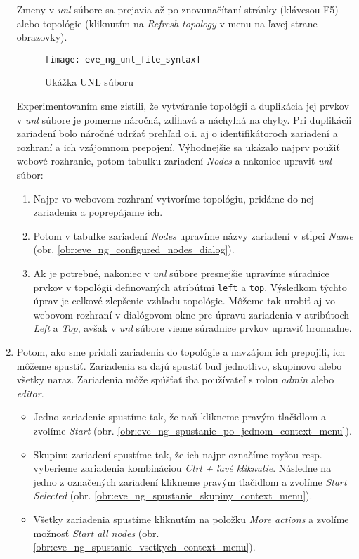\begin{enumerate}[noitemsep]
Zmeny v \emph{unl} súbore sa prejavia až po znovunačítaní stránky (klávesou F5) alebo topológie (kliknutím na \emph{Refresh topology} v menu na ľavej strane obrazovky).

\begin{figure}
    \centering
    \texttt{[image: eve\_ng\_unl\_file\_syntax]}
    \caption{Ukážka UNL súboru}
    \label{obr:eve_ng_unl_file_syntax}
\end{figure}
    
Experimentovaním sme zistili, že vytváranie topológii a duplikácia jej prvkov v \emph{unl} súbore je pomerne náročná, zdĺhavá a náchylná na chyby. Pri duplikácii zariadení bolo náročné udržať prehľad o.i. aj o identifikátoroch zariadení a rozhraní a ich vzájomnom prepojení. Výhodnejšie sa ukázalo najprv použiť webové rozhranie, potom tabuľku zariadení \emph{Nodes} a nakoniec upraviť \emph{unl} súbor:
    
    \begin{enumerate}[noitemsep]
        \item Najpr vo webovom rozhraní vytvoríme topológiu, pridáme do nej zariadenia a poprepájame ich.
        \item Potom v tabuľke zariadení \emph{Nodes} upravíme názvy zariadení v stĺpci \emph{Name} (obr. \ref{obr:eve_ng_configured_nodes_dialog}).
        \item Ak je potrebné, nakoniec v \emph{unl} súbore presnejšie upravíme súradnice prvkov v topológii definovaných atribútmi \texttt{left} a \texttt{top}. Výsledkom týchto úprav je celkové zlepšenie vzhľadu topológie. Môžeme tak urobiť aj vo webovom rozhraní v dialógovom okne pre úpravu zariadenia v atribútoch \emph{Left} a \emph{Top}, avšak v \emph{unl} súbore vieme súradnice prvkov upraviť hromadne.
    \end{enumerate}
    
    \item Potom, ako sme pridali zariadenia do topológie a navzájom ich prepojili, ich môžeme spustiť. Zariadenia sa dajú spustiť buď jednotlivo, skupinovo alebo všetky naraz. Zariadenia môže spúšťať iba používateľ s rolou \emph{admin} alebo \emph{editor}.

    \begin{itemize}[noitemsep]
        \item Jedno zariadenie spustíme tak, že naň klikneme pravým tlačidlom a zvolíme \emph{Start} (obr. \ref{obr:eve_ng_spustanie_po_jednom_context_menu}).
        \item Skupinu zariadení spustíme tak, že ich najpr označíme myšou resp. vyberieme zariadenia kombináciou \emph{Ctrl + ľavé kliknutie}. Následne na jedno z označených zariadení klikneme pravým tlačidlom a zvolíme \emph{Start Selected} (obr. \ref{obr:eve_ng_spustanie_skupiny_context_menu}).
        \item Všetky zariadenia spustíme kliknutím na položku \emph{More actions} a zvolíme možnosť \emph{Start all nodes} (obr. \ref{obr:eve_ng_spustanie_vsetkych_context_menu}).
    \end{itemize}


\end{enumerate}
